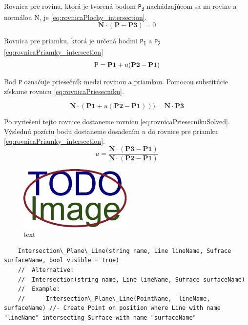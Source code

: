 Rovnica pre rovinu, ktorá je tvorená bodom \texttt{P\textsubscript{3}} nachádzajúcom sa na rovine a normálou N, je \ref{eq:rovnicaPlochy_intersection}. 
\begin{equation}
    \textbf{N} \cdot (\textbf{P} - \textbf{P3}) = 0
	\label{eq:rovnicaPlochy_intersection}
\end{equation}

Rovnica pre priamku, ktorá je určená bodmi \texttt{P\textsubscript{1}} a \texttt{P\textsubscript{2}}
\ref{eq:rovnicaPriamky_intersection}
\begin{equation}
	\textup{P}=\textbf{P1}+u (\textbf{P2}-\textbf{P1})
    \label{eq:rovnicaPriamky_intersection}
\end{equation}
	
Bod \texttt{P} označuje priesečník medzi rovinou a priamkou. Pomocou substitúcie získame rovnicu \ref{eq:rovnicaPriesecniku}.

\begin{equation}
	\textbf{N} \cdot (\textbf{P1}+u(\textbf{P2}-\textbf{P1}))) = \textbf{N} \cdot \textbf{P3}
    \label{eq:rovnicaPriesecniku}
\end{equation}

Po vyriešení tejto rovnice dostaneme rovnicu \ref{eq:rovnicaPriesecnikuSolved}. Výslednú pozíciu bodu dostaneme dosadením $u$ do rovnice pre  priamku \ref{eq:rovnicaPriamky_intersection}.
\begin{equation}
	u=\frac
{\textbf{N} \cdot (\textbf{P3}-\textbf{P1})}
{\textbf{N} \cdot (\textbf{P2}-\textbf{P1})}
    \label{eq:rovnicaPriesecnikuSolved}
\end{equation}

\begin{figure}[H]
	\centering
	\includegraphics[width=0.5\textwidth]{obrazky-figures/placeholder.pdf}
	\caption{text}
	\label{fig:1}
\end{figure}



\begin{lstlisting}
	Intersection\_Plane\_Line(string name, Line lineName, Sufrace surfaceName, bool visible = true)
	//	Alternative:
	//	Intersection(string name, Line lineName, Sufrace surfaceName)
	//	Example:
	//		Intersection\_Plane\_Line(PointName,  lineName, surfaceName) //- Create Point on position where Line with name "lineName" intersecting Surface with name "surfaceName"

\end{lstlisting}


